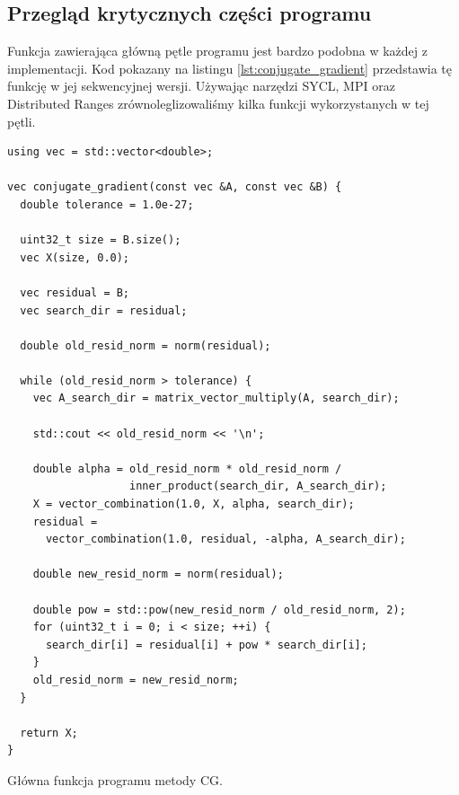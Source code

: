 \documentclass[a4paper,12pt]{book} %
\begin{document}
\subsection{Przegląd krytycznych części programu}
Funkcja zawierająca główną pętle programu jest bardzo podobna w każdej z implementacji. Kod pokazany na listingu \ref{lst:conjugate_gradient} przedstawia tę funkcję w jej sekwencyjnej wersji. Używając narzędzi SYCL, MPI oraz Distributed Ranges zrównoleglizowaliśmy kilka funkcji wykorzystanych w tej pętli.

\begin{lstfloat}
\lstset{language=C++}
\begin{lstlisting}[frame=single]
using vec = std::vector<double>;

vec conjugate_gradient(const vec &A, const vec &B) {
  double tolerance = 1.0e-27;

  uint32_t size = B.size();
  vec X(size, 0.0);

  vec residual = B;
  vec search_dir = residual;

  double old_resid_norm = norm(residual);

  while (old_resid_norm > tolerance) {
    vec A_search_dir = matrix_vector_multiply(A, search_dir);

    std::cout << old_resid_norm << '\n';

    double alpha = old_resid_norm * old_resid_norm /
                   inner_product(search_dir, A_search_dir);
    X = vector_combination(1.0, X, alpha, search_dir);
    residual = 
	  vector_combination(1.0, residual, -alpha, A_search_dir);

    double new_resid_norm = norm(residual);

    double pow = std::pow(new_resid_norm / old_resid_norm, 2);
    for (uint32_t i = 0; i < size; ++i) {
      search_dir[i] = residual[i] + pow * search_dir[i];
    }
    old_resid_norm = new_resid_norm;
  }

  return X;
}
\end{lstlisting}
\caption{Główna funkcja programu metody CG.}
\label{lst:conjugate_gradient}
\end{lstfloat}
\end{document}
